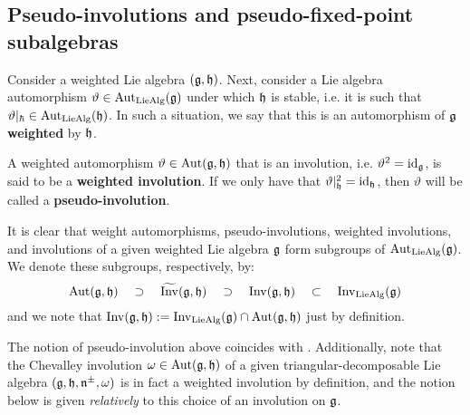     \subsection{Pseudo-involutions and pseudo-fixed-point subalgebras}
        \begin{definition} \label{def: weighted_automorphisms_of_weighted_lie_algebras}
            Consider a weighted Lie algebra $(\mathfrak{g}, \mathfrak{h})$. Next, consider a Lie algebra automorphism $\vartheta \in \operatorname{Aut}_{\mathrm{Lie}\mathrm{Alg}}(\mathfrak{g})$ under which $\mathfrak{h}$ is stable, i.e. it is such that $\vartheta|_{\hbar} \in \operatorname{Aut}_{\mathrm{Lie}\mathrm{Alg}}(\mathfrak{h})$. In such a situation, we say that this is an automorphism of $\mathfrak{g}$ \textbf{weighted} by $\mathfrak{h}$.
            
            A weighted automorphism $\vartheta \in \operatorname{Aut}(\mathfrak{g}, \mathfrak{h})$ that is an involution, i.e. $\vartheta^2 = \mathrm{id}_{\mathfrak{g}}$, is said to be a \textbf{weighted involution}. If we only have that $\vartheta|_{\mathfrak{h}}^2 = \mathrm{id}_{\mathfrak{h}}$, then $\vartheta$ will be called a \textbf{pseudo-involution}. 
        \end{definition}
        It is clear that weight automorphisms, pseudo-involutions, weighted involutions, and involutions of a given weighted Lie algebra $\mathfrak{g}$ form subgroups of $\operatorname{Aut}_{\mathrm{Lie}\mathrm{Alg}}(\mathfrak{g})$. We denote these subgroups, respectively, by:
            $$\operatorname{Aut}(\mathfrak{g}, \mathfrak{h}) \quad \supset \quad \widetilde{\operatorname{Inv}}(\mathfrak{g}, \mathfrak{h}) \quad \supset \quad \operatorname{Inv}(\mathfrak{g}, \mathfrak{h}) \quad \subset \quad \operatorname{Inv}_{\mathrm{Lie}\mathrm{Alg}}(\mathfrak{g})$$
        and we note that $\operatorname{Inv}(\mathfrak{g}, \mathfrak{h}) := \operatorname{Inv}_{\mathrm{Lie}\mathrm{Alg}}(\mathfrak{g}) \cap \operatorname{Aut}(\mathfrak{g}, \mathfrak{h})$ just by definition.
        \begin{remark}
            The notion of pseudo-involution above coincides with \cite[Definition 1.1]{regelskis_vlaar_kac_moody_pseudo_symmetric_pairs}. Additionally, note that the Chevalley involution $\omega \in \operatorname{Aut}(\mathfrak{g}, \mathfrak{h})$ of a given triangular-decomposable Lie algebra $(\mathfrak{g}, \mathfrak{h}, \mathfrak{n}^{\pm}, \omega)$ is in fact a weighted involution by definition, and the notion below is given \textit{relatively} to this choice of an involution on $\mathfrak{g}$.
        \end{remark}
        
